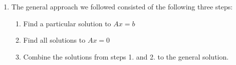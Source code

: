 \begin{enumerate}[itemsep=0.2cm]
    \item The general approach we followed consisted of the following three steps:
    \begin{enumerate}
        \item Find a particular solution to $Ax = b$
        \hfill \cite{mfml/book/mml/Deisenroth-Faisal-Ong}

        \item Find all solutions to $Ax = 0$
        \hfill \cite{mfml/book/mml/Deisenroth-Faisal-Ong}

        \item Combine the solutions from steps 1. and 2. to the general solution.
        \hfill \cite{mfml/book/mml/Deisenroth-Faisal-Ong}
    \end{enumerate}

    
\end{enumerate}



















